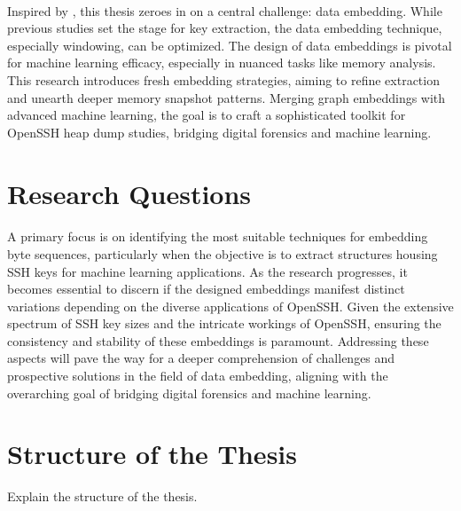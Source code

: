 \paragraph*{}Inspired by , this thesis zeroes in on a central challenge: data embedding. While previous studies set the stage for key extraction, the data embedding technique, especially windowing, can be optimized. The design of data embeddings is pivotal for machine learning efficacy, especially in nuanced tasks like memory analysis. This research introduces fresh embedding strategies, aiming to refine extraction and unearth deeper memory snapshot patterns. Merging graph embeddings with advanced machine learning, the goal is to craft a sophisticated toolkit for OpenSSH heap dump studies, bridging digital forensics and machine learning.


\section{Research Questions}

\paragraph*{}A primary focus is on identifying the most suitable techniques for embedding byte sequences, particularly when the objective is to extract structures housing SSH keys for machine learning applications. As the research progresses, it becomes essential to discern if the designed embeddings manifest distinct variations depending on the diverse applications of OpenSSH. Given the extensive spectrum of SSH key sizes and the intricate workings of OpenSSH, ensuring the consistency and stability of these embeddings is paramount. Addressing these aspects will pave the way for a deeper comprehension of challenges and prospective solutions in the field of data embedding, aligning with the overarching goal of bridging digital forensics and machine learning.

\section{Structure of the Thesis}

Explain the structure of the thesis. 

